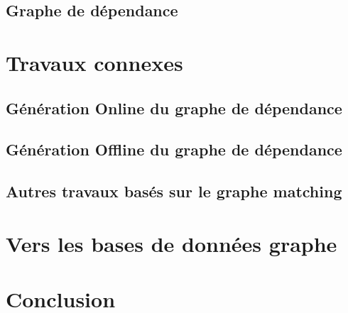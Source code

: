   \subsection{Graphe de dépendance}
  \label{sec:graph-de-depandence}
  \cite{Omer2011}

\section{Travaux connexes}
\label{sec:travaux-relatives}


  \subsection{Génération Online du graphe de dépendance}
  \label{sec:generation-online-du}

  \subsection{Génération Offline du graphe de dépendance}
  \label{sec:gener-offl-du}

  \subsection{Autres travaux basés sur le graphe matching}
  \label{sec:autres-travaux}

\section{Vers les bases de données graphe}
\label{sec:vers-les-bases}

\section{Conclusion}
\label{sec:conclusion-2}


